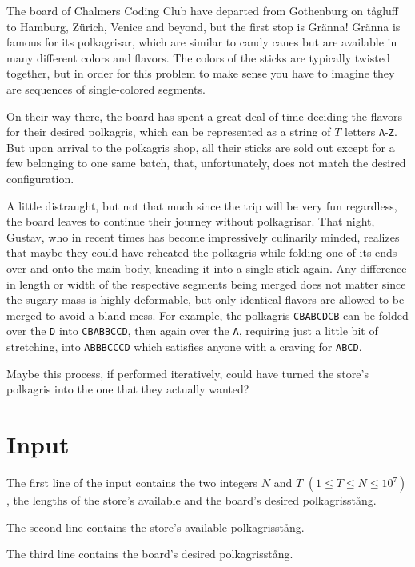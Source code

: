 \noindent

The board of Chalmers Coding Club have departed from Gothenburg on tågluff to Hamburg, Zürich,
Venice and beyond, but the first stop is Gränna! Gränna is famous for its polkagrisar, which are
similar to candy canes but are available in many different colors and flavors. The colors of the
sticks are typically twisted together, but in order for this problem to make sense you have to
imagine they are sequences of single-colored segments.

On their way there, the board has spent a great deal of time deciding the flavors for their desired
polkagris, which can be represented as a string of $T$ letters \verb|A|-\verb|Z|. But upon arrival
to the polkagris shop, all their sticks are sold out except for a few belonging to one same batch,
that, unfortunately, does not match the desired configuration.

A little distraught, but not that much since the trip will be very fun regardless, the board leaves
to continue their journey without polkagrisar. That night, Gustav, who in recent times has become
impressively culinarily minded, realizes that maybe they could have reheated the polkagris while
folding one of its ends over and onto the main body, kneading it into a single stick again. Any
difference in length or width of the respective segments being merged does not matter since the
sugary mass is highly deformable, but only identical flavors are allowed to be merged to avoid a
bland mess. For example, the polkagris \verb|CBABCDCB| can be folded over the \verb|D| into
\verb|CBABBCCD|, then again over the \verb|A|, requiring just a little bit of stretching, into
\verb|ABBBCCCD| which satisfies anyone with a craving for \verb|ABCD|.

Maybe this process, if performed iteratively, could have turned the store's polkagris
into the one that they actually wanted?

\section*{Input}

The first line of the input contains the two integers $N$ and $T$ $(1 \leq T \leq N \leq 10^7)$, the lengths of the store's
available and the board's desired polkagrisstång.

The second line contains the store's available polkagrisstång.

The third line contains the board's desired polkagrisstång.

